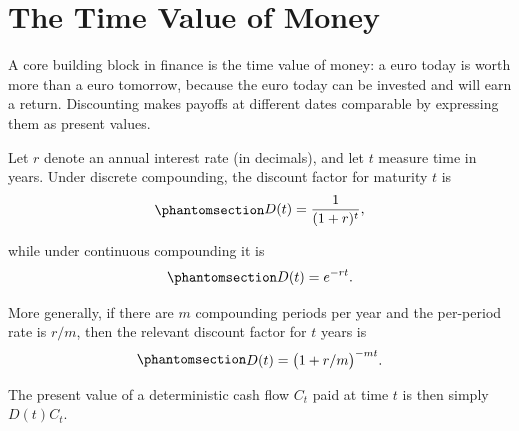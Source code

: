 \documentclass[
  letterpaper,
  DIV=11,
  numbers=noendperiod]{scrreprt}
\begin{document}

\chapter{The Time Value of Money}\label{sec:time_value_money}

A core building block in finance is the time value of money: a euro
today is worth more than a euro tomorrow, because the euro today can be
invested and will earn a return. Discounting makes payoffs at different
dates comparable by expressing them as present values.

Let \(r\) denote an annual interest rate (in decimals), and let \(t\)
measure time in years. Under discrete compounding, the discount factor
for maturity \(t\) is
\begin{equation}\protect\phantomsection\label{eq-discount-factor-discrete}{
\begin{align}
    D(t) = \frac{1}{(1 + r)^t},
\end{align}
}\end{equation}

while under continuous compounding it is
\begin{equation}\protect\phantomsection\label{eq-discount-factor-continuous}{
\begin{align}
    D(t) = e^{-rt}.
\end{align}
}\end{equation}

More generally, if there are \(m\) compounding periods per year and the
per-period rate is \(r/m\), then the relevant discount factor for \(t\)
years is
\begin{equation}\protect\phantomsection\label{eq-discount-factor-general}{
\begin{align}
    D(t) = \big(1 + r/m\big)^{-mt}.
\end{align}
}\end{equation}

The present value of a deterministic cash flow \(C_t\) paid at time
\(t\) is then simply \(D(t) C_t\).
\end{document}
